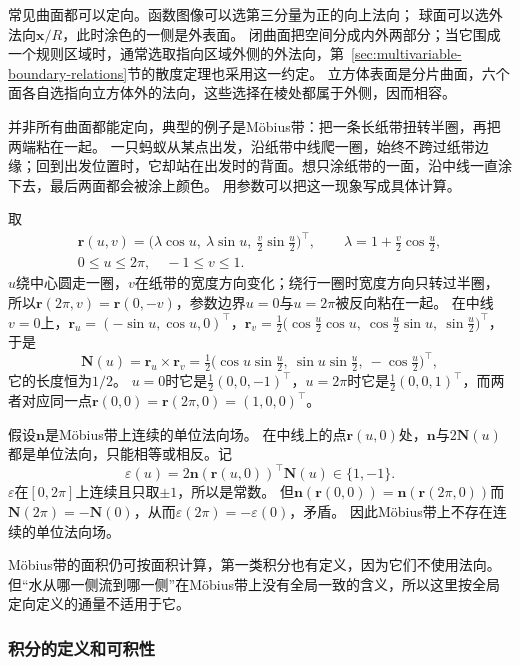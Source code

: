 常见曲面都可以定向。函数图像可以选第三分量为正的向上法向；
球面可以选外法向$\bm x/R$，此时涂色的一侧是外表面。
闭曲面把空间分成内外两部分；当它围成一个规则区域时，通常选取指向区域外侧的外法向，第~\ref{sec:multivariable-boundary-relations}节的散度定理也采用这一约定。
立方体表面是分片曲面，六个面各自选指向立方体外的法向，这些选择在棱处都属于外侧，因而相容。

并非所有曲面都能定向，典型的例子是Möbius带：把一条长纸带扭转半圈，再把两端粘在一起。
一只蚂蚁从某点出发，沿纸带中线爬一圈，始终不跨过纸带边缘；回到出发位置时，它却站在出发时的背面。想只涂纸带的一面，沿中线一直涂下去，最后两面都会被涂上颜色。
用参数可以把这一现象写成具体计算。

\begin{example}[Möbius带上的法向绕行一圈后反向]
\label{ex:analysis-mobius-normal-reversal}
取
\[
 \begin{gathered}
 \bm r(u,v)=\bigl(\lambda\cos u,\ \lambda\sin u,\ \tfrac v2\sin\tfrac u2\bigr)^\top,
 \qquad \lambda=1+\tfrac v2\cos\tfrac u2,\\
 0\leq u\leq2\pi,\quad -1\leq v\leq1.
 \end{gathered}
\]
$u$绕中心圆走一圈，$v$在纸带的宽度方向变化；绕行一圈时宽度方向只转过半圈，所以$\bm r(2\pi,v)=\bm r(0,-v)$，参数边界$u=0$与$u=2\pi$被反向粘在一起。
在中线$v=0$上，$\bm r_u=(-\sin u,\cos u,0)^\top$，$\bm r_v=\tfrac12\bigl(\cos\tfrac u2\cos u,\ \cos\tfrac u2\sin u,\ \sin\tfrac u2\bigr)^\top$，于是
\[
 \bm N(u)=\bm r_u\times\bm r_v=\tfrac12\bigl(\cos u\sin\tfrac u2,\ \sin u\sin\tfrac u2,\ -\cos\tfrac u2\bigr)^\top,
\]
它的长度恒为$1/2$。
$u=0$时它是$\frac12(0,0,-1)^\top$，$u=2\pi$时它是$\frac12(0,0,1)^\top$，而两者对应同一点$\bm r(0,0)=\bm r(2\pi,0)=(1,0,0)^\top$。

假设$\bm n$是Möbius带上连续的单位法向场。
在中线上的点$\bm r(u,0)$处，$\bm n$与$2\bm N(u)$都是单位法向，只能相等或相反。记
\[
 \varepsilon(u)=2\bm n(\bm r(u,0))^\top\bm N(u)\in\{1,-1\}.
\]
$\varepsilon$在$[0,2\pi]$上连续且只取$\pm1$，所以是常数。
但$\bm n(\bm r(0,0))=\bm n(\bm r(2\pi,0))$而$\bm N(2\pi)=-\bm N(0)$，从而$\varepsilon(2\pi)=-\varepsilon(0)$，矛盾。
因此Möbius带上不存在连续的单位法向场。
\end{example}

Möbius带的面积仍可按面积计算，第一类积分也有定义，因为它们不使用法向。
但“水从哪一侧流到哪一侧”在Möbius带上没有全局一致的含义，所以这里按全局定向定义的通量不适用于它。

\subsubsection{积分的定义和可积性}

